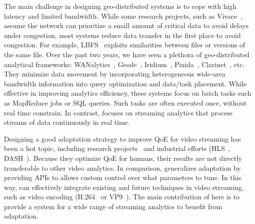  The main challenge in designing geo-distributed
systems is to cope with high latency and limited bandwidth. While some research
projects, such as Vivace~\cite{cho2012surviving}, assume the network can
prioritize a small amount of critical data to avoid delays under congestion,
most systems reduce data transfer in the first place to avoid congestion. For
example, LBFS~\cite{muthitacharoen2001low} exploits similarities between files
or versions of the same file. Over the past two years, we have seen a plethora
of geo-distributed analytical frameworks:
WANalytics~\cite{vulimiri2015wananlytics}, Geode~\cite{vulimiri2015global},
Iridium~\cite{pu2015low}, Pixida~\cite{kloudas2015pixida},
Clarinet~\cite{viswanathan2016clarinet}, etc. They minimize data movement by
incorporating heterogeneous wide-area bandwidth information into query
optimization and data/task placement. While effective in improving analytics
efficiency, these systems focus on batch tasks such as MapReduce jobs or
SQL queries. Such tasks are often executed once, without real time constrain. In
contrast, \sysname{} focuses on streaming analytics that process streams of data
continuously in real time.









 Designing a good adaptation strategy to improve
QoE for video streaming has been a hot topic, including research
projects~\cite{mao2017neural, yin2015control, sun2016cs2p} and industrial
efforts (HLS~\cite{pantos2016http}, DASH~\cite{sodagar2011mpeg,
  michalos2012dynamic}). Because they optimize QoE for humans, their results are
not directly transferable to other video analytics. In comparison, \sysname{}
generalizes adaptation by providing \maybe{} APIs to allows custom control over
what parameters to tune. In this way, \sysname{} can effectively integrate
existing and future techniques in video streaming, such as video encoding
(H.264~\cite{richardson2011h} or VP9~\cite{grange2016vp9}). The main
contribution of \sysname{} here is to provide a system for a wide range of
streaming analytics to benefit from adaptation.

